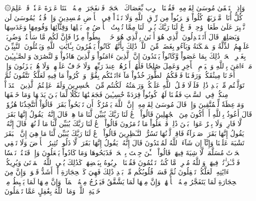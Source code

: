 ۞وَإِذِ ٱسۡتَسۡقَىٰ مُوسَىٰ لِقَوۡمِهِۦ فَقُلۡنَا ٱضۡرِب بِّعَصَاكَ ٱلۡحَجَرَۖ فَٱنفَجَرَتۡ مِنۡهُ ٱثۡنَتَا عَشۡرَةَ عَيۡنٗاۖ قَدۡ عَلِمَ كُلُّ أُنَاسٖ مَّشۡرَبَهُمۡۖ كُلُواْ وَٱشۡرَبُواْ مِن رِّزۡقِ ٱللَّهِ وَلَا تَعۡثَوۡاْ فِي ٱلۡأَرۡضِ مُفۡسِدِينَ
وَإِذۡ قُلۡتُمۡ يَٰمُوسَىٰ لَن نَّصۡبِرَ عَلَىٰ طَعَامٖ وَٰحِدٖ فَٱدۡعُ لَنَا رَبَّكَ يُخۡرِجۡ لَنَا مِمَّا تُنۢبِتُ ٱلۡأَرۡضُ مِنۢ بَقۡلِهَا وَقِثَّآئِهَا وَفُومِهَا وَعَدَسِهَا وَبَصَلِهَاۖ قَالَ أَتَسۡتَبۡدِلُونَ ٱلَّذِي هُوَ أَدۡنَىٰ بِٱلَّذِي هُوَ خَيۡرٌۚ ٱهۡبِطُواْ مِصۡرٗا فَإِنَّ لَكُم مَّا سَأَلۡتُمۡۗ وَضُرِبَتۡ عَلَيۡهِمُ ٱلذِّلَّةُ وَٱلۡمَسۡكَنَةُ وَبَآءُو بِغَضَبٖ مِّنَ ٱللَّهِۚ ذَٰلِكَ بِأَنَّهُمۡ كَانُواْ يَكۡفُرُونَ بِـَٔايَٰتِ ٱللَّهِ وَيَقۡتُلُونَ ٱلنَّبِيِّـۧنَ بِغَيۡرِ ٱلۡحَقِّۚ ذَٰلِكَ بِمَا عَصَواْ وَّكَانُواْ يَعۡتَدُونَ
إِنَّ ٱلَّذِينَ ءَامَنُواْ وَٱلَّذِينَ هَادُواْ وَٱلنَّصَٰرَىٰ وَٱلصَّـٰبِـِٔينَ مَنۡ ءَامَنَ بِٱللَّهِ وَٱلۡيَوۡمِ ٱلۡأٓخِرِ وَعَمِلَ صَٰلِحٗا فَلَهُمۡ أَجۡرُهُمۡ عِندَ رَبِّهِمۡ وَلَا خَوۡفٌ عَلَيۡهِمۡ وَلَا هُمۡ يَحۡزَنُونَ
وَإِذۡ أَخَذۡنَا مِيثَٰقَكُمۡ وَرَفَعۡنَا فَوۡقَكُمُ ٱلطُّورَ خُذُواْ مَآ ءَاتَيۡنَٰكُم بِقُوَّةٖ وَٱذۡكُرُواْ مَا فِيهِ لَعَلَّكُمۡ تَتَّقُونَ
ثُمَّ تَوَلَّيۡتُم مِّنۢ بَعۡدِ ذَٰلِكَۖ فَلَوۡلَا فَضۡلُ ٱللَّهِ عَلَيۡكُمۡ وَرَحۡمَتُهُۥ لَكُنتُم مِّنَ ٱلۡخَٰسِرِينَ
وَلَقَدۡ عَلِمۡتُمُ ٱلَّذِينَ ٱعۡتَدَوۡاْ مِنكُمۡ فِي ٱلسَّبۡتِ فَقُلۡنَا لَهُمۡ كُونُواْ قِرَدَةً خَٰسِـِٔينَ
فَجَعَلۡنَٰهَا نَكَٰلٗا لِّمَا بَيۡنَ يَدَيۡهَا وَمَا خَلۡفَهَا وَمَوۡعِظَةٗ لِّلۡمُتَّقِينَ
وَإِذۡ قَالَ مُوسَىٰ لِقَوۡمِهِۦٓ إِنَّ ٱللَّهَ يَأۡمُرُكُمۡ أَن تَذۡبَحُواْ بَقَرَةٗۖ قَالُوٓاْ أَتَتَّخِذُنَا هُزُوٗاۖ قَالَ أَعُوذُ بِٱللَّهِ أَنۡ أَكُونَ مِنَ ٱلۡجَٰهِلِينَ
قَالُواْ ٱدۡعُ لَنَا رَبَّكَ يُبَيِّن لَّنَا مَا هِيَۚ قَالَ إِنَّهُۥ يَقُولُ إِنَّهَا بَقَرَةٞ لَّا فَارِضٞ وَلَا بِكۡرٌ عَوَانُۢ بَيۡنَ ذَٰلِكَۖ فَٱفۡعَلُواْ مَا تُؤۡمَرُونَ
قَالُواْ ٱدۡعُ لَنَا رَبَّكَ يُبَيِّن لَّنَا مَا لَوۡنُهَاۚ قَالَ إِنَّهُۥ يَقُولُ إِنَّهَا بَقَرَةٞ صَفۡرَآءُ فَاقِعٞ لَّوۡنُهَا تَسُرُّ ٱلنَّـٰظِرِينَ
قَالُواْ ٱدۡعُ لَنَا رَبَّكَ يُبَيِّن لَّنَا مَا هِيَ إِنَّ ٱلۡبَقَرَ تَشَٰبَهَ عَلَيۡنَا وَإِنَّآ إِن شَآءَ ٱللَّهُ لَمُهۡتَدُونَ
قَالَ إِنَّهُۥ يَقُولُ إِنَّهَا بَقَرَةٞ لَّا ذَلُولٞ تُثِيرُ ٱلۡأَرۡضَ وَلَا تَسۡقِي ٱلۡحَرۡثَ مُسَلَّمَةٞ لَّا شِيَةَ فِيهَاۚ قَالُواْ ٱلۡـَٰٔنَ جِئۡتَ بِٱلۡحَقِّۚ فَذَبَحُوهَا وَمَا كَادُواْ يَفۡعَلُونَ
وَإِذۡ قَتَلۡتُمۡ نَفۡسٗا فَٱدَّـٰرَ ٰٔتُمۡ فِيهَاۖ وَٱللَّهُ مُخۡرِجٞ مَّا كُنتُمۡ تَكۡتُمُونَ
فَقُلۡنَا ٱضۡرِبُوهُ بِبَعۡضِهَاۚ كَذَٰلِكَ يُحۡيِ ٱللَّهُ ٱلۡمَوۡتَىٰ وَيُرِيكُمۡ ءَايَٰتِهِۦ لَعَلَّكُمۡ تَعۡقِلُونَ
ثُمَّ قَسَتۡ قُلُوبُكُم مِّنۢ بَعۡدِ ذَٰلِكَ فَهِيَ كَٱلۡحِجَارَةِ أَوۡ أَشَدُّ قَسۡوَةٗۚ وَإِنَّ مِنَ ٱلۡحِجَارَةِ لَمَا يَتَفَجَّرُ مِنۡهُ ٱلۡأَنۡهَٰرُۚ وَإِنَّ مِنۡهَا لَمَا يَشَّقَّقُ فَيَخۡرُجُ مِنۡهُ ٱلۡمَآءُۚ وَإِنَّ مِنۡهَا لَمَا يَهۡبِطُ مِنۡ خَشۡيَةِ ٱللَّهِۗ وَمَا ٱللَّهُ بِغَٰفِلٍ عَمَّا تَعۡمَلُونَ
